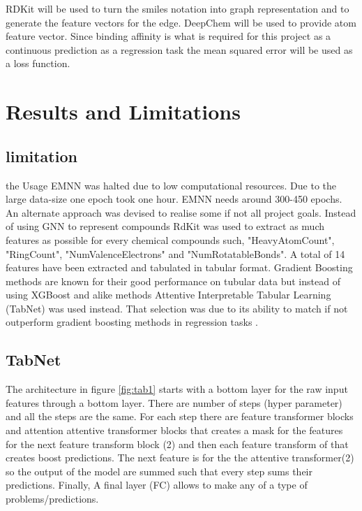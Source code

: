 \documentclass[10pt,twocolumn,letterpaper]{article}
\begin{document}
RDKit will be used to turn the smiles notation into graph representation and to generate the feature vectors for the edge. DeepChem will be used to provide atom feature vector. Since binding affinity is what is required for this project as a continuous prediction as a regression task the mean squared error will be used as a loss function.


\section{Results and Limitations }

\subsection{limitation}

the Usage EMNN was halted due to low computational resources. Due to the large data-size one epoch took one hour. EMNN needs around 300-450 epochs. An alternate approach was devised to realise some if not all project goals. Instead of using GNN to represent compounds RdKit was used to extract as much features as possible for every chemical compounds such, "HeavyAtomCount", "RingCount", "NumValenceElectrons" and "NumRotatableBonds". A total of 14 features have been extracted and tabulated in tabular format. Gradient Boosting methods are known for their good performance on tubular data but instead of using XGBoost and alike methods Attentive Interpretable Tabular Learning (TabNet) was used instead. That selection was due to its ability to match if not outperform gradient boosting methods in regression tasks \cite{Arik2019}. 

\subsection{TabNet}

 The architecture in figure \ref{fig:tab1} starts with a bottom layer for the raw input features through a bottom layer. There are number of steps (hyper parameter) and all the steps are the same. For each step there are feature transformer blocks and attention attentive transformer blocks that creates a mask  for the features for the next feature transform block (2) and then each feature transform of that creates boost predictions. The next feature is for the the attentive transformer(2) so the output of the model are summed such that every step sums their predictions. Finally, A final layer (FC) allows to make any of a type of problems/predictions. 
\end{document}
